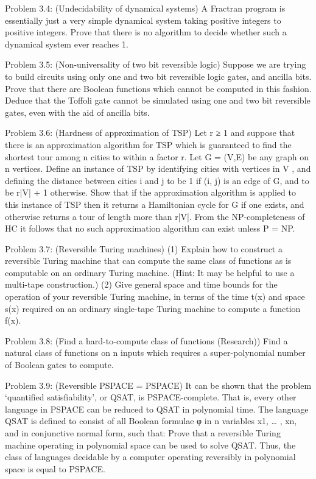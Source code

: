 \documentclass{article}
\newcommand{\0}{{$|0\rangle$}}
\newcommand{\1}{{$|1\rangle$}}
\newcommand{\2}{\frac{1}{\sqrt{2}}}
\begin{document}
Problem 3.4: (Undecidability of dynamical systems) A Fractran program is essentially just a very simple dynamical system taking positive integers to positive integers. Prove that there is no algorithm to decide whether such a dynamical system ever reaches 1.

Problem 3.5: (Non-universality of two bit reversible logic) Suppose we are trying to build circuits using only one and two bit reversible logic gates, and ancilla bits. Prove that there are Boolean functions which cannot be computed in this fashion. Deduce that the Toffoli gate cannot be simulated using one and two bit reversible gates, even with the aid of ancilla bits.

Problem 3.6: (Hardness of approximation of TSP) Let r ≥ 1 and suppose that there is an approximation algorithm for TSP which is guaranteed to find the shortest tour among n cities to within a factor r. Let G = (V,E) be any graph on n vertices. Define an instance of TSP by identifying cities with vertices in V , and defining the distance between cities i and j to be 1 if (i, j) is an edge of G, and to be r|V| + 1 otherwise. Show that if the approximation algorithm is applied to this instance of TSP then it returns a Hamiltonian cycle for G if one exists, and otherwise returns a tour of length more than r|V|. From the NP-completeness of HC it follows that no such approximation algorithm can exist unless P = NP.

Problem 3.7: (Reversible Turing machines) (1) Explain how to construct a reversible Turing machine that can compute the same class of functions as is computable on an ordinary Turing machine. (Hint: It may be helpful to use a multi-tape construction.) (2) Give general space and time bounds for the operation of your reversible Turing machine, in terms of the time t(x) and space s(x) required on an ordinary single-tape Turing machine to compute a function f(x).

Problem 3.8: (Find a hard-to-compute class of functions (Research)) Find a natural class of functions on n inputs which requires a super-polynomial number of Boolean gates to compute.

Problem 3.9: (Reversible PSPACE = PSPACE) It can be shown that the problem ‘quantified satisfiability’, or QSAT, is PSPACE-complete. That is, every other language in PSPACE can be reduced to QSAT in polynomial time. The language QSAT is defined to consist of all Boolean formulae φ in n variables x1, … , xn, and in conjunctive normal form, such that: Prove that a reversible Turing machine operating in polynomial space can be used to solve QSAT. Thus, the class of languages decidable by a computer operating reversibly in polynomial space is equal to PSPACE.
\end{document}
